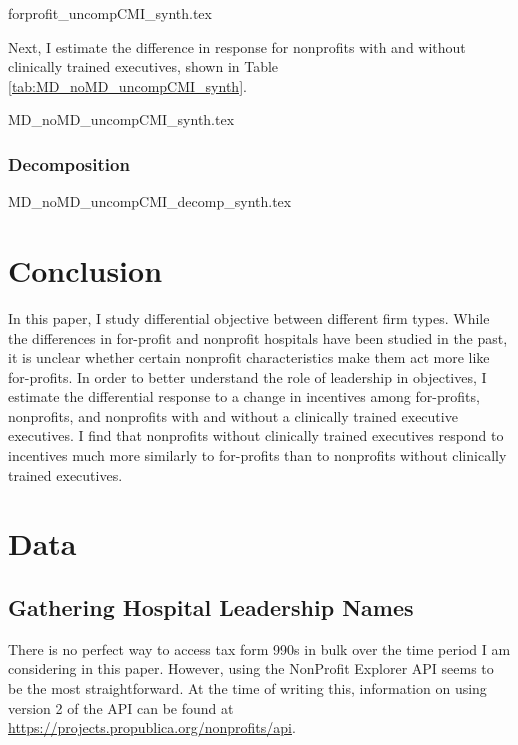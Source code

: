\documentclass[12pt]{article}
\begin{document}
    {forprofit_uncompCMI_synth.tex}

    Next, I estimate the difference in response for nonprofits with and without clinically trained executives, shown in Table \ref{tab:MD_noMD_uncompCMI_synth}. 

    {MD_noMD_uncompCMI_synth.tex}

    \subsubsection{Decomposition}

    {MD_noMD_uncompCMI_decomp_synth.tex}
    

    \section{Conclusion}

    In this paper, I study differential objective between different firm types. While the differences in for-profit and nonprofit hospitals have been studied in the past, it is unclear whether certain nonprofit characteristics make them act more like for-profits. In order to better understand the role of leadership in objectives, I estimate the differential response to a change in incentives among for-profits, nonprofits, and nonprofits with and without a clinically trained executive executives. I find that nonprofits without clinically trained executives respond to incentives much more similarly to for-profits than to nonprofits without clinically trained executives.

	
	\newpage

    \printbibliography

\appendix

 \section{Data}\label{appendixdata}

\subsection{Gathering Hospital Leadership Names}

There is no perfect way to access tax form 990s in bulk over the time period I am considering in this paper. However, using the NonProfit Explorer API seems to be the most straightforward. At the time of writing this, information on using version 2 of the API can be found at \hyperlink{https://projects.propublica.org/nonprofits/api}{https://projects.propublica.org/nonprofits/api}. 
    
\end{document}
